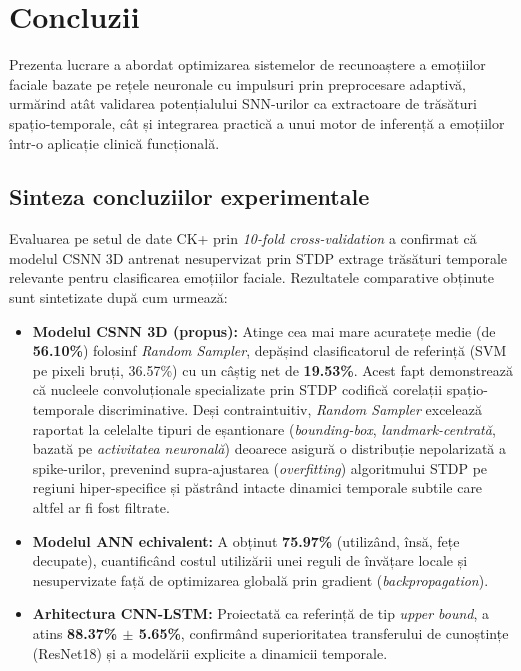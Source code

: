 \chapter{Concluzii}
\label{conclusions}

Prezenta lucrare a abordat optimizarea sistemelor de recunoaștere a emoțiilor faciale bazate pe rețele neuronale cu impulsuri prin preprocesare adaptivă, urmărind atât validarea potențialului SNN-urilor ca extractoare de trăsături spațio-temporale, cât și integrarea practică a unui motor de inferență a emoțiilor într-o aplicație clinică funcțională.

\section*{Sinteza concluziilor experimentale}

Evaluarea pe setul de date CK+ prin \textit{10-fold cross-validation} a confirmat că modelul CSNN 3D antrenat nesupervizat prin STDP extrage trăsături temporale relevante pentru clasificarea emoțiilor faciale. Rezultatele comparative obținute sunt sintetizate după cum urmează:

\begin{itemize}
	\item \textbf{Modelul CSNN 3D (propus):} Atinge cea mai mare acuratețe medie (de \textbf{56.10\%}) folosinf \textit{Random Sampler}, depășind clasificatorul de referință (SVM pe pixeli bruți, 36.57\%) cu un câștig net de \textbf{19.53\%}. Acest fapt demonstrează că nucleele convoluționale specializate prin STDP codifică corelații spațio-temporale discriminative. Deși contraintuitiv, \textit{Random Sampler} excelează raportat la celelalte tipuri de eșantionare (\textit{bounding-box}, \textit{landmark-centrată}, bazată pe \textit{activitatea neuronală}) deoarece asigură o distribuție nepolarizată a spike-urilor, prevenind supra-ajustarea (\textit{overfitting}) algoritmului STDP pe regiuni hiper-specifice și păstrând intacte dinamici temporale subtile care altfel ar fi fost filtrate.
	\item \textbf{Modelul ANN echivalent:} A obținut \textbf{75.97\%} (utilizând, însă, fețe decupate), cuantificând costul utilizării unei reguli de învățare locale și nesupervizate față de optimizarea globală prin gradient (\textit{backpropagation}).
	\item \textbf{Arhitectura CNN-LSTM:} Proiectată ca referință de tip \textit{upper bound}, a atins \textbf{88.37\% $\pm$ 5.65\%}, confirmând superioritatea transferului de cunoștințe (ResNet18) și a modelării explicite a dinamicii temporale.
\end{itemize}

